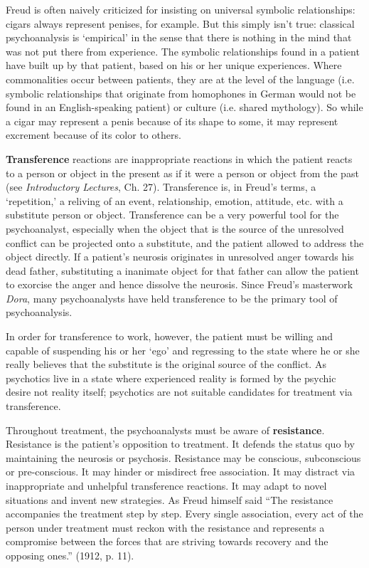 \begin{refsection}
Freud is often naively criticized for insisting on universal symbolic relationships: cigars always represent penises, for example. But this simply isn't true: classical psychoanalysis is `empirical' in the sense that there is nothing in the mind that was not put there from experience. The symbolic relationships found in a patient have built up by that patient, based on his or her unique experiences. Where commonalities occur between patients, they are at the level of the language (i.e. symbolic relationships that originate from homophones in German would not be found in an English-speaking patient) or culture (i.e. shared mythology). So while a cigar may represent a penis because of its shape to some, it may represent excrement because of its color to others.

\textbf{Transference} reactions are inappropriate reactions in which the patient reacts to a person or object in the present as if it were a person or object from the past (see \emph{Introductory Lectures}, Ch. 27). Transference is, in Freud's terms, a `repetition,' a reliving of an event, relationship, emotion, attitude, etc. with a substitute person or object. Transference can be a very powerful tool for the psychoanalyst, especially when the object that is the source of the unresolved conflict can be projected onto a substitute, and the patient allowed to address the object directly. If a patient's neurosis originates in unresolved anger towards his dead father, substituting a inanimate object for that father can allow the patient to exorcise the anger and hence dissolve the neurosis. Since Freud's masterwork \emph{Dora}, many psychoanalysts have held transference to be the primary tool of psychoanalysis.

In order for transference to work, however, the patient must be willing and capable of suspending his or her `ego' and regressing to the state where he or she really believes that the substitute is the original source of the conflict. As psychotics live in a state where experienced reality is formed by the psychic desire not reality itself; psychotics are not suitable candidates for treatment via transference.

Throughout treatment, the psychoanalysts must be aware of \textbf{resistance}. Resistance is the patient's opposition to treatment. It defends the status quo by maintaining the neurosis or psychosis. Resistance may be conscious, subconscious or pre-conscious. It may hinder or misdirect free association. It may distract via inappropriate and unhelpful transference reactions. It may adapt to novel situations and invent new strategies. As Freud himself said ``The resistance accompanies the treatment step by step. Every single association, every act of the person under treatment must reckon with the resistance and represents a compromise between the forces that are striving towards recovery and the opposing ones.'' (1912, p. 11).


\end{refsection}
